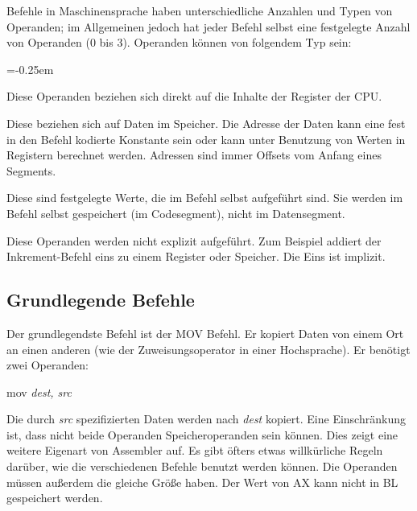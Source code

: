Befehle in Maschinensprache haben unterschiedliche Anzahlen und
Typen von Operanden; im Allgemeinen jedoch hat jeder Befehl selbst
eine festgelegte Anzahl von Operanden (0 bis 3). Operanden k\"{o}nnen
von folgendem Typ sein:
\begin{description}
\parskip=-0.25em %

\item[register:] Diese Operanden beziehen sich direkt auf die Inhalte
der Register der CPU\@.

\item[memory:] Diese beziehen sich auf Daten im Speicher. Die Adresse
der Daten kann eine fest in den Befehl kodierte Konstante sein oder
kann unter Benutzung von Werten in Registern berechnet werden.
Adressen sind immer Offsets vom Anfang eines Segments.

\item[immediate:]  Diese sind festgelegte Werte, die
im Befehl selbst aufgef\"{u}hrt sind. Sie werden im Befehl selbst
gespeichert (im Codesegment), nicht im Datensegment.

\item[implied:] Diese Operanden werden nicht explizit aufgef\"{u}hrt. Zum
Beispiel addiert der Inkrement-Befehl eins zu einem Register oder
Speicher. Die Eins ist implizit.
\end{description}

\subsection{Grundlegende Befehle}

Der grundlegendste Befehl ist der {\code MOV}
 Befehl. Er kopiert Daten von einem Ort
an einen anderen (wie der Zuweisungsoperator in einer Hochsprache).
Er ben\"{o}tigt zwei Operanden:
\begin{CodeQuote}
  mov {\em dest, src}
\end{CodeQuote}
Die durch {\em src} spezifizierten Daten werden nach {\em dest}
kopiert. Eine Einschr\"{a}nkung ist, dass nicht beide Operanden
Speicheroperanden sein k\"{o}nnen. Dies zeigt eine weitere Eigenart von
Assembler auf. Es gibt \"{o}fters etwas willk\"{u}rliche Regeln dar\"{u}ber, wie
die verschiedenen Befehle benutzt werden k\"{o}nnen. Die Operanden
m\"{u}ssen au{\ss}erdem die gleiche Gr\"{o}{\ss}e haben. Der Wert von AX kann nicht
in BL gespeichert werden.

